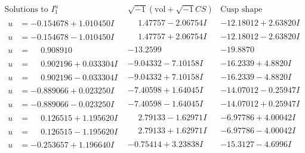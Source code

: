 \documentclass[1p]{elsarticle_modified}
\theoremstyle{definition}
\newcommand{\I}{\sqrt{-1}}
\begin{document}
$$\begin{array}{c|c|c}  
\text{Solutions to }I^u_{1}& \I (\text{vol} + \sqrt{-1}CS) & \text{Cusp shape}\\
 \hline 
\begin{aligned}
u &= -0.154678 + 1.010450 I\end{aligned}
 & \phantom{-}1.47757 - 2.06754 I & -12.18012 + 2.63820 I \\ \hline\begin{aligned}
u &= -0.154678 - 1.010450 I\end{aligned}
 & \phantom{-}1.47757 + 2.06754 I & -12.18012 - 2.63820 I \\ \hline\begin{aligned}
u &= \phantom{-}0.908910\phantom{ +0.000000I}\end{aligned}
 & -13.2599\phantom{ +0.000000I} & -19.8870\phantom{ +0.000000I} \\ \hline\begin{aligned}
u &= \phantom{-}0.902196 + 0.033304 I\end{aligned}
 & -9.04332 - 7.10158 I & -16.2339 + 4.8820 I \\ \hline\begin{aligned}
u &= \phantom{-}0.902196 - 0.033304 I\end{aligned}
 & -9.04332 + 7.10158 I & -16.2339 - 4.8820 I \\ \hline\begin{aligned}
u &= -0.889066 + 0.023250 I\end{aligned}
 & -7.40598 + 1.64045 I & -14.07012 - 0.25947 I \\ \hline\begin{aligned}
u &= -0.889066 - 0.023250 I\end{aligned}
 & -7.40598 - 1.64045 I & -14.07012 + 0.25947 I \\ \hline\begin{aligned}
u &= \phantom{-}0.126515 + 1.195620 I\end{aligned}
 & \phantom{-}2.79133 - 1.62971 I & -6.97786 + 4.00042 I \\ \hline\begin{aligned}
u &= \phantom{-}0.126515 - 1.195620 I\end{aligned}
 & \phantom{-}2.79133 + 1.62971 I & -6.97786 - 4.00042 I \\ \hline\begin{aligned}
u &= -0.253657 + 1.196640 I\end{aligned}
 & -0.75414 + 3.23838 I & -15.3127 - 4.6996 I \\ \hline\begin{aligned}

\end{aligned}
\end{array}$$
\end{document}
